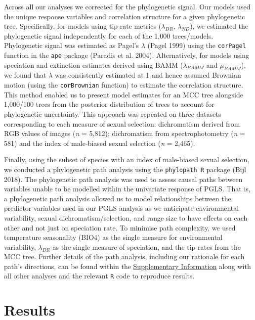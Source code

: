 \documentclass[]{article}
\begin{document}
Across all our analyses we corrected for the phylogenetic signal. Our
models used the unique response variables and correlation structure for
a given phylogenetic tree. Specifically, for models using tip-rate
metrics (\(\lambda_{DR}\), \(\lambda_{ND}\)), we estimated the
phylogenetic signal independently for each of the 1,000 trees/models.
Phylogenetic signal was estimated as Pagel's \(\lambda\) (Pagel 1999)
using the \texttt{corPagel} function in the \texttt{ape} package
(Paradis et al. 2004). Alternatively, for models using speciation and
extinction estimates derived using BAMM (\(\lambda_{BAMM}\) and
\(\mu_{BAMM}\)), we found that \(\lambda\) was consistently estimated at
1 and hence assumed Brownian motion (using the \texttt{corBrownian}
function) to estimate the correlation structure. This method enabled us
to present model estimates for an MCC tree alongside 1,000/100 trees
from the posterior distribution of trees to account for phylogenetic
uncertainty. This approach was repeated on three datasets corresponding
to each measure of sexual selection: dichromatism derived from RGB
values of images (\emph{n} = 5,812); dichromatism from spectrophotometry
(\emph{n} = 581) and the index of male-biased sexual selection (\emph{n}
= 2,465).

Finally, using the subset of species with an index of male-biased sexual
selection, we conducted a phylogenetic path analysis using the
\texttt{phylopath\ R} package (Bijl 2018). The phylogenetic path
analysis was used to assess causal paths between variables unable to be
modelled within the univariate response of PGLS. That is, a phylogenetic
path analysis allowed us to model relationships between the predictor
variables used in our PGLS analysis as we anticipate environmental
variability, sexual dichromatism/selection, and range size to have
effects on each other and not just on speciation rate. To minimise path
complexity, we used temperature seasonality (BIO4) as the single measure
for environmental variability, \(\lambda_{DR}\) as the single measure of
speciation, and the tip-rates from the MCC tree. Further details of the
path analysis, including our rationale for each path's directions, can
be found within the
\href{https://justincally.github.io/SexualSelection_Speciation/}{Supplementary Information}
along with all other analyses and the relevant \texttt{R} code to
reproduce results. 

\hypertarget{results}{%
\section{Results}\label{results}}
\end{document}
